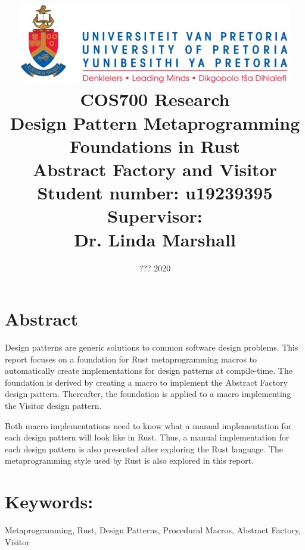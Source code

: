 \documentclass[a4paper,10pt]{article}
\title
{
   \includegraphics[width=12cm]{up_logo.png} \\
   \vspace{2cm}
   \textbf{COS700 Research} \\ \vspace{0.5cm}
   \textbf{Design Pattern Metaprogramming Foundations in Rust\\ \large Abstract Factory and Visitor} \\ \vspace{0.5cm}
   \textbf{Student number:} u19239395 \\ \vspace{0.5cm}
   \textbf{Supervisor}: \\ Dr. Linda Marshall
}
\date{??? 2020}
\begin{document}
\author{}

\maketitle
{}

\newpage
\linespread{1.25}

\section*{Abstract}
Design patterns are generic solutions to common software design problems.
This report focuses on a foundation for Rust metaprogramming macros to automatically create implementations for design patterns at compile-time.
The foundation is derived by creating a macro to implement the Abstract Factory design pattern.
Thereafter, the foundation is applied to a macro implementing the Visitor design pattern.

Both macro implementations need to know what a manual implementation for each design pattern will look like in Rust.
Thus, a manual implementation for each design pattern is also presented after exploring the Rust language.
The metaprogramming style used by Rust is also explored in this report.

\section*{Keywords:}
Metaprogramming,
Rust,
Design Patterns,
Procedural Macros,
Abstract Factory,
Visitor

\newpage
{}


% 
% 
% 
% 




\end{document}
